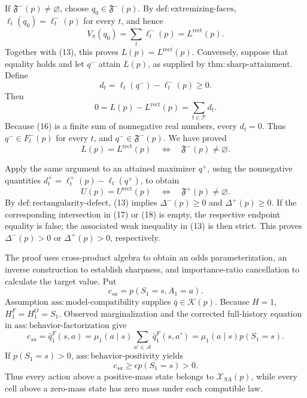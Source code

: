 If \(\mathfrak F^-(p)\neq\varnothing\), choose \(q_0\in\mathfrak F^-(p)\).  By \(\mathrm{def{:}extremizing\text{-}faces}\), \(\ell_t(q_0)=\ell_t^-(p)\) for every \(t\), and hence
\[
 V_\pi(q_0)=\sum_t\ell_t^-(p)=L^{\mathrm{rect}}(p).
\tag{14}
\]
Together with (13), this proves \(L(p)=L^{\mathrm{rect}}(p)\).  Conversely, suppose that equality holds and let \(q^-\) attain \(L(p)\), as supplied by \(\mathrm{thm{:}sharp\text{-}attainment}\).  Define
\[
 d_t=\ell_t(q^-)-\ell_t^-(p)\geq0.
\tag{15}
\]
Then
\[
 0=L(p)-L^{\mathrm{rect}}(p)=\sum_{t\in\mathcal T}d_t.
\tag{16}
\]
Because (16) is a finite sum of nonnegative real numbers, every \(d_t=0\).  Thus \(q^-\in F_t^-(p)\) for every \(t\), and \(q^-\in\mathfrak F^-(p)\).  We have proved
\[
 L(p)=L^{\mathrm{rect}}(p)
 \quad\Longleftrightarrow\quad
 \mathfrak F^-(p)\neq\varnothing.
\tag{17}
\]

Apply the same argument to an attained maximizer \(q^+\), using the nonnegative quantities \(d_t^+=\ell_t^+(p)-\ell_t(q^+)\), to obtain
\[
 U(p)=U^{\mathrm{rect}}(p)
 \quad\Longleftrightarrow\quad
 \mathfrak F^+(p)\neq\varnothing.
\tag{18}
\]
By \(\mathrm{def{:}rectangularity\text{-}defect}\), (13) implies \(\Delta^-(p)\geq0\) and \(\Delta^+(p)\geq0\).  If the corresponding intersection in (17) or (18) is empty, the respective endpoint equality is false; the associated weak inequality in (13) is then strict.  This proves \(\Delta^-(p)>0\) or \(\Delta^+(p)>0\), respectively.

The proof uses cross-product algebra to obtain an odds parameterization, an inverse construction to establish sharpness, and importance-ratio cancellation to calculate the target value.  Put
\[
 c_{sa}=p(S_1=s,A_1=a).
\tag{19}
\]
Assumption \(\mathrm{ass{:}model\text{-}compatibility}\) supplies \(\bar q\in\mathcal K(p)\).  Because \(H=1\), \(H_1^F=H_1^O=S_1\).  Observed marginalization and the corrected full-history equation in \(\mathrm{ass{:}behavior\text{-}factorization}\) give
\[
 c_{sa}=\bar q_1^F(s,a)
 =\mu_1(a\mid s)\sum_{a'\in\mathcal A}\bar q_1^F(s,a')
 =\mu_1(a\mid s)p(S_1=s).
\tag{20}
\]
If \(p(S_1=s)>0\), \(\mathrm{ass{:}behavior\text{-}positivity}\) yields
\[
 c_{sa}\geq\epsilon p(S_1=s)>0.
\tag{21}
\]
Thus every action above a positive-mass state belongs to \(\mathcal X_{SA}(p)\), while every cell above a zero-mass state has zero mass under each compatible law.

